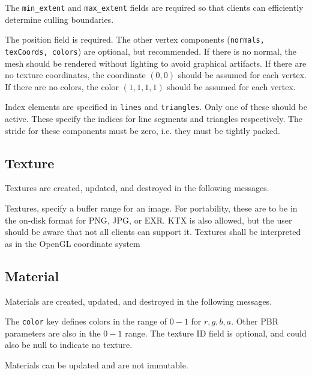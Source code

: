 \documentclass[11pt, oneside]{amsart}
\begin{document}
The \texttt{min\_extent} and \texttt{max\_extent} fields are required so that clients can efficiently determine culling boundaries.

The position field is required. The other vertex components (\texttt{normals, texCoords, colors}) are optional, but recommended. If there is no normal, the mesh should be rendered without lighting to avoid graphical artifacts. If there are no texture coordinates, the coordinate $(0,0)$ should be assumed for each vertex. If there are no colors, the color $(1,1,1,1)$ should be assumed for each vertex.

Index elements are specified in \texttt{lines} and \texttt{triangles}. Only one of these should be active. These specify the indices for line segments and triangles respectively. The stride for these components must be zero, i.e. they must be tightly packed.

\subsection{Texture}

Textures are created, updated, and destroyed in the following messages.



Textures, specify a buffer range for an image. For portability, these are to be in the on-disk format for PNG, JPG, or EXR. KTX is also allowed, but the user should be aware that not all clients can support it. Textures shall be interpreted as in the OpenGL coordinate system

\subsection{Material}

Materials are created, updated, and destroyed in the following messages.



The \texttt{color} key defines colors in the range of $0 - 1$ for $r,g,b,a$. Other PBR parameters are also in the $0 - 1$ range. The texture ID field is optional, and could also be null to indicate no texture.

Materials can be updated and are not immutable.
\end{document}
